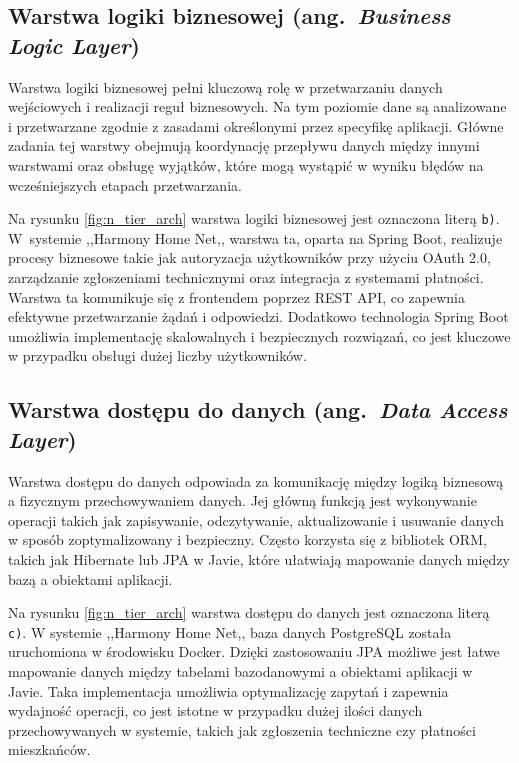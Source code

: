 \subsection{Warstwa logiki biznesowej (ang.\ \emph{Business Logic Layer})}

Warstwa logiki biznesowej pełni kluczową rolę w przetwarzaniu danych wejściowych i realizacji reguł biznesowych. Na tym poziomie dane są analizowane i przetwarzane zgodnie z zasadami określonymi przez specyfikę aplikacji. Główne zadania tej warstwy obejmują koordynację przepływu danych między innymi warstwami oraz obsługę wyjątków, które mogą wystąpić w wyniku błędów na wcześniejszych etapach przetwarzania.

Na rysunku \ref{fig:n_tier_arch} warstwa logiki biznesowej jest oznaczona  literą \texttt{b)}. W~systemie ,,Harmony Home Net,, warstwa ta, oparta na Spring Boot, realizuje procesy biznesowe takie jak autoryzacja użytkowników przy użyciu OAuth 2.0, zarządzanie zgłoszeniami technicznymi oraz integracja z systemami płatności. Warstwa ta komunikuje się z frontendem poprzez REST API, co zapewnia efektywne przetwarzanie żądań i odpowiedzi. Dodatkowo technologia Spring Boot umożliwia implementację skalowalnych i bezpiecznych rozwiązań, co jest kluczowe w przypadku obsługi dużej liczby użytkowników.

\subsection{Warstwa dostępu do danych (ang.\ \emph{Data Access Layer})}

Warstwa dostępu do danych odpowiada za komunikację między logiką biznesową a fizycznym przechowywaniem danych. Jej główną funkcją jest wykonywanie operacji takich jak zapisywanie, odczytywanie, aktualizowanie i usuwanie danych w sposób zoptymalizowany i bezpieczny. Często korzysta się z bibliotek ORM, takich jak Hibernate lub JPA w Javie, które ułatwiają mapowanie danych między bazą a obiektami aplikacji.

Na rysunku \ref{fig:n_tier_arch} warstwa dostępu do danych jest oznaczona literą \texttt{c)}. W systemie ,,Harmony Home Net,, baza danych PostgreSQL została uruchomiona w środowisku Docker. Dzięki zastosowaniu JPA możliwe jest łatwe mapowanie danych między tabelami bazodanowymi a obiektami aplikacji w Javie. Taka implementacja umożliwia optymalizację zapytań i zapewnia wydajność operacji, co jest istotne w przypadku dużej ilości danych przechowywanych w systemie, takich jak zgłoszenia techniczne czy płatności mieszkańców.

